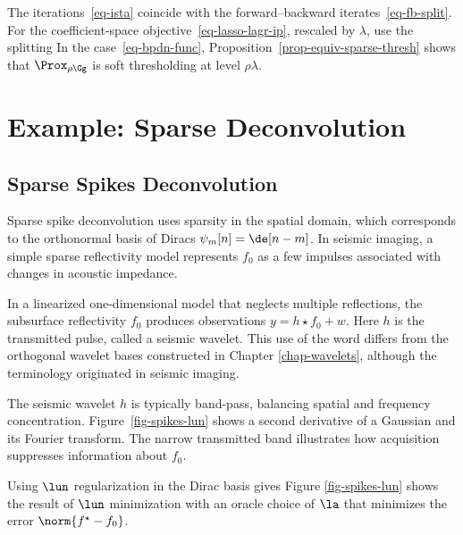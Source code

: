 The iterations~\eqref{eq-ista} coincide with the forward--backward iterates~\eqref{eq-fb-split}. For the coefficient-space objective~\eqref{eq-lasso-lagr-ip}, rescaled by $\lambda$, use the splitting
%
In the case~\eqref{eq-bpdn-func}, Proposition~\ref{prop-equiv-sparse-thresh} shows that $\Prox_{\rho\Gg}$ is soft thresholding at level $\rho\lambda$.



\section{Example: Sparse Deconvolution}


\subsection{Sparse Spikes Deconvolution}

Sparse spike deconvolution uses sparsity in the spatial domain, which corresponds to the orthonormal basis of Diracs $\psi_m[n] = \de[n-m]$. In seismic imaging, a simple sparse reflectivity model represents $f_0$ as a few impulses associated with changes in acoustic impedance.

In a linearized one-dimensional model that neglects multiple reflections, the subsurface reflectivity $f_0$ produces observations $y=h \star f_0 + w$. Here $h$ is the transmitted pulse, called a seismic wavelet. This use of the word differs from the orthogonal wavelet bases constructed in Chapter \ref{chap-wavelets}, although the terminology originated in seismic imaging.

The seismic wavelet $h$ is typically band-pass, balancing spatial and frequency concentration. Figure~\ref{fig-spikes-lun} shows a second derivative of a Gaussian and its Fourier transform. The narrow transmitted band illustrates how acquisition suppresses information about $f_0$.


Using $\lun$ regularization in the Dirac basis gives
Figure \ref{fig-spikes-lun} shows the result of $\lun$ minimization with an oracle choice of $\la$ that minimizes the error $\norm{f^\star-f_0}$.


